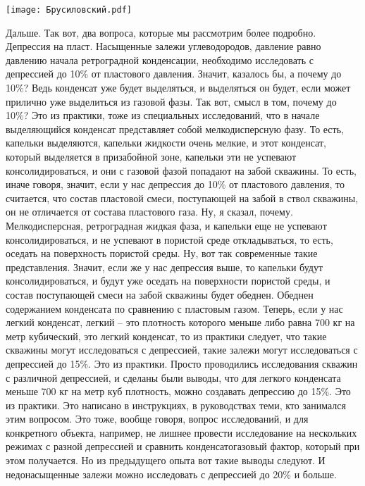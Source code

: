 \documentclass[main.tex]{subfiles}
\begin{document}
\begin{center}
\texttt{[image: Брусиловский.pdf]}
\end{center}

Дальше. Так вот, два вопроса, которые мы рассмотрим более подробно. Депрессия на пласт.
Насыщенные залежи углеводородов, давление равно давлению начала ретроградной конденсации, необходимо исследовать с депрессией до 10\% от пластового давления.
Значит, казалось бы, а почему до 10\%?
Ведь конденсат уже будет выделяться, и выделяться он будет, если может прилично уже выделиться из газовой фазы.
Так вот, смысл в том, почему до 10\%?
Это из практики, тоже из специальных исследований, что в начале выделяющийся конденсат представляет собой мелкодисперсную фазу.
То есть, капельки выделяются, капельки жидкости очень мелкие, и этот конденсат, который выделяется в призабойной зоне, капельки эти не успевают консолидироваться, и они с газовой фазой попадают на забой скважины. 
То есть, иначе говоря, значит, если у нас депрессия до 10\% от пластового давления, то считается, что состав пластовой смеси, поступающей на забой в ствол скважины, он не отличается от состава пластового газа.
Ну, я сказал, почему.
Мелкодисперсная, ретроградная жидкая фаза, и капельки еще не успевают консолидироваться, и не успевают в пористой среде откладываться, то есть, оседать на поверхность пористой среды.
Ну, вот так современные такие представления.
Значит, если же у нас депрессия выше, то капельки будут консолидироваться, и будут уже оседать на поверхности пористой среды, и состав поступающей смеси на забой скважины будет обеднен.
Обеднен содержанием конденсата по сравнению с пластовым газом.
Теперь, если у нас легкий конденсат, легкий -- это плотность которого меньше либо равна 700 кг на метр кубический, это легкий конденсат, то из практики следует, что такие скважины могут исследоваться с депрессией, такие залежи могут исследоваться с депрессией до 15\%.
Это из практики.
Просто проводились исследования скважин с различной депрессией, и сделаны были выводы, что для легкого конденсата меньше 700 кг на метр куб плотность, можно создавать депрессию до 15\%.
Это из практики.
Это написано в инструкциях, в руководствах теми, кто занимался этим вопросом.
Это тоже, вообще говоря, вопрос исследований, и для конкретного объекта, например, не лишнее провести исследование на нескольких режимах с разной депрессией и сравнить конденсатогазовый фактор, который при этом получается.
Но из предыдущего опыта вот такие выводы следуют.
И недонасыщенные залежи можно исследовать с депрессией до 20\% и больше.
\end{document}
